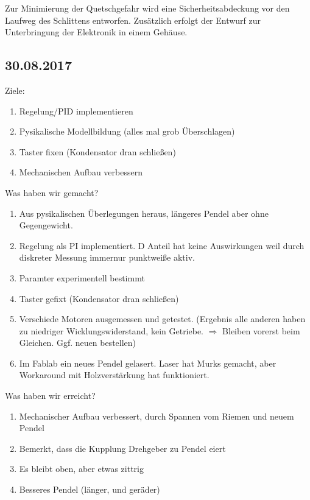 \documentclass[fontsize=12pt,a4paper,parskip]{scrartcl}
\begin{document}
Zur Minimierung der Quetschgefahr wird eine Sicherheitsabdeckung vor den Laufweg des Schlittens entworfen. Zusätzlich erfolgt der Entwurf zur Unterbringung der Elektronik in einem Gehäuse.



\subsection*{30.08.2017}
Ziele:
\begin{enumerate}
       \item Regelung/PID implementieren
       \item Pysikalische Modellbildung (alles mal grob Überschlagen)
       \item Taster fixen (Kondensator dran schließen)
       \item Mechanischen Aufbau verbessern
\end{enumerate}

Was haben wir gemacht?
\begin{enumerate}
        \item Aus pysikalischen Überlegungen heraus, längeres Pendel aber ohne Gegengewicht.
        \item Regelung als PI implementiert. D Anteil hat keine Auswirkungen weil durch diskreter Messung immernur punktweiße aktiv.
        \item Paramter experimentell bestimmt
        \item Taster gefixt (Kondensator dran schließen)
        \item Verschiede Motoren ausgemessen und getestet. (Ergebnis alle anderen haben zu niedriger Wicklungswiderstand, kein Getriebe. $\Rightarrow$ Bleiben vorerst beim Gleichen. Ggf. neuen bestellen)
        \item Im Fablab ein neues Pendel gelasert. Laser hat Murks gemacht, aber Workaround mit Holzverstärkung hat funktioniert.
\end{enumerate}

Was haben wir erreicht?
\begin{enumerate}
        \item Mechanischer Aufbau verbessert, durch Spannen vom Riemen und neuem Pendel
        \item Bemerkt, dass die Kupplung Drehgeber zu Pendel eiert
        \item Es bleibt oben, aber etwas zittrig
        \item Besseres Pendel (länger, und geräder)
\end{enumerate}
\end{document}
